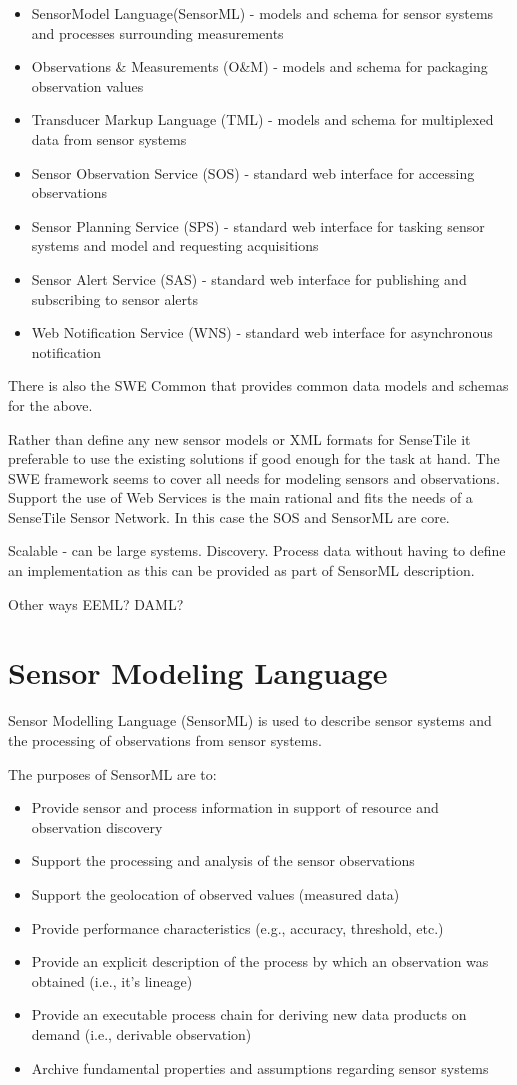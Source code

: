 \documentclass[]{final_report}
\begin{document}
\begin{itemize}
\item  SensorModel Language(SensorML) - models and schema for sensor systems and processes surrounding measurements
\item  Observations \& Measurements (O\&M) - models and schema for packaging observation values
\item  Transducer Markup Language (TML) - models and schema for multiplexed data from sensor systems
\item  Sensor Observation Service (SOS) - standard web interface for accessing observations
\item  Sensor Planning Service (SPS) - standard web interface for tasking sensor systems and model and requesting acquisitions
\item   Sensor Alert Service (SAS) - standard web interface for publishing and subscribing to sensor alerts
\item   Web Notification Service (WNS) - standard web interface for asynchronous notification
\end{itemize}
There is also the SWE Common that provides common data models and schemas for the above.

Rather than define any new sensor models or XML formats for SenseTile it preferable to use the existing solutions if good enough for the task at hand. The SWE framework seems to cover all needs for modeling sensors and observations. Support the use of Web Services is the main rational and fits the needs of a SenseTile Sensor Network. In this case the SOS and SensorML are core.

Scalable - can be  large systems. Discovery. Process data without having to define an implementation as this
can be provided as part of SensorML description.

Other ways EEML? DAML?

\section{Sensor Modeling Language}
Sensor Modelling Language (SensorML) is used to describe sensor systems and the processing of observations from sensor systems.

The purposes of SensorML are to:
\begin{itemize}
\item Provide sensor and process information in support of resource and observation discovery
\item Support the processing and analysis of the sensor observations
\item Support the geolocation of observed values (measured data)
\item Provide performance characteristics (e.g., accuracy, threshold, etc.)
\item Provide an explicit description of the process by which an observation was obtained (i.e., it’s lineage)
\item Provide an executable process chain for deriving new data products on demand (i.e., derivable observation)
\item Archive fundamental properties and assumptions regarding sensor systems
\end{itemize}
\end{document}
